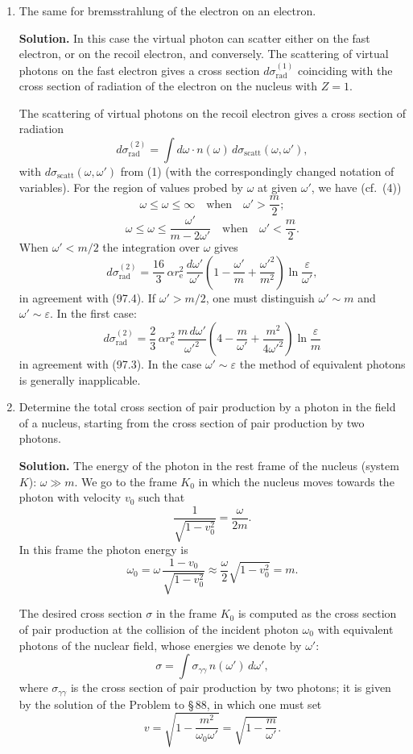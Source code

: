 \begin{enumerate}
\item The same for bremsstrahlung of the electron on an electron.

\textbf{Solution.} In this case the virtual photon can scatter either on the fast electron, or on the recoil electron, and conversely. The scattering of virtual photons on the fast electron gives a cross section $d\sigma_\text{rad}^{(1)}$ coinciding with the cross section of radiation of the electron on the nucleus with $Z = 1$.

The scattering of virtual photons on the recoil electron gives a cross section of radiation
\[
d\sigma_\text{rad}^{(2)} = \int d\omega\cdot n(\omega)\,d\sigma_\text{scatt}(\omega,\omega'),
\]
with $d\sigma_\text{scatt}(\omega,\omega')$ from (1) (with the correspondingly changed notation of variables). For the region of values probed by $\omega$ at given $\omega'$, we have (cf.\ (4))
\[
\omega \leqslant \omega \leqslant \infty \quad \text{when} \quad \omega' > \frac{m}{2};
\]
\[
\omega \leqslant \omega \leqslant \frac{\omega'}{m - 2\omega'} \quad \text{when} \quad \omega' < \frac{m}{2}.
\]
When $\omega' < m/2$ the integration over $\omega$ gives
\[
d\sigma_\text{rad}^{(2)} = \frac{16}{3}\,\alpha r_\mathrm{e}^2\,\frac{d\omega'}{\omega'}\!\left(1 - \frac{\omega'}{m} + \frac{\omega'^2}{m^2}\right)\ln\frac{\varepsilon}{\omega'},
\]
in agreement with (97.4). If $\omega' > m/2$, one must distinguish $\omega' \sim m$ and $\omega' \sim \varepsilon$. In the first case:
\[
d\sigma_\text{rad}^{(2)} = \frac{2}{3}\,\alpha r_\mathrm{e}^2\,\frac{m\,d\omega'}{\omega'^2}\!\left(4 - \frac{m}{\omega'} + \frac{m^2}{4\omega'^2}\right)\ln\frac{\varepsilon}{m}
\]
in agreement with (97.3). In the case $\omega' \sim \varepsilon$ the method of equivalent photons is generally inapplicable.

\item Determine the total cross section of pair production by a photon in the field of a nucleus, starting from the cross section of pair production by two photons.


\textbf{Solution.} The energy of the photon in the rest frame of the nucleus (system $K$): $\omega \gg m$.
We go to the frame $K_0$ in which the nucleus moves towards the photon with velocity $v_0$ such that
\[
\frac{1}{\sqrt{1 - v_0^2}} = \frac{\omega}{2m}.
\]
In this frame the photon energy is
\[
\omega_0 = \omega\,\frac{1 - v_0}{\sqrt{1 - v_0^2}} \approx \frac{\omega}{2}\sqrt{1 - v_0^2} = m.
\]

The desired cross section $\sigma$ in the frame $K_0$ is computed as the cross section of pair production at the collision of the incident photon $\omega_0$ with equivalent photons of the nuclear field, whose energies we denote by $\omega'$:
\[
\sigma = \int\sigma_{\gamma\gamma}\,n(\omega')\,d\omega',
\]
where $\sigma_{\gamma\gamma}$ is the cross section of pair production by two photons; it is given by the solution of the Problem to \S\,88, in which one must set
\[
v = \sqrt{1 - \frac{m^2}{\omega_0\omega'}} = \sqrt{1 - \frac{m}{\omega'}}.
\]


\end{enumerate}
